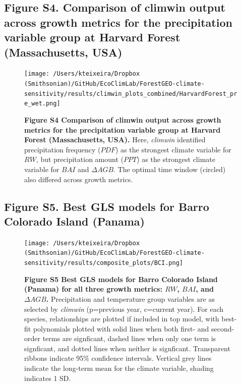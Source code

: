 \documentclass[
]{article}
\begin{document}
\newpage

\hypertarget{figure-s4.-comparison-of-climwin-output-across-growth-metrics-for-the-precipitation-variable-group-at-harvard-forest-massachusetts-usa}{%
\subsection{Figure S4. Comparison of climwin output across growth
metrics for the precipitation variable group at Harvard Forest
(Massachusetts,
USA)}\label{figure-s4.-comparison-of-climwin-output-across-growth-metrics-for-the-precipitation-variable-group-at-harvard-forest-massachusetts-usa}}

\begin{figure}
\centering
\texttt{[image: /Users/kteixeira/Dropbox (Smithsonian)/GitHub/EcoClimLab/ForestGEO-climate-sensitivity/results/climwin\_plots\_combined/HarvardForest\_pre\_wet.png]}
\caption{\textbf{Figure S4 \textbar{} Comparison of climwin output
across growth metrics for the precipitation variable group at Harvard
Forest (Massachusetts, USA).} Here, \emph{climwin} identified
precipitation frequency (\(PDF\)) as the strongest climate variable for
\(RW\), but precipitation amount (\(PPT\)) as the strongest climate
variable for \(BAI\) and \(\Delta AGB\). The optimal time window
(circled) also differed across growth metrics.}
\end{figure}

\newpage

\hypertarget{figure-s5.-best-gls-models-for-barro-colorado-island-panama}{%
\subsection{Figure S5. Best GLS models for Barro Colorado Island
(Panama)}\label{figure-s5.-best-gls-models-for-barro-colorado-island-panama}}

\begin{figure}
\centering
\texttt{[image: /Users/kteixeira/Dropbox (Smithsonian)/GitHub/EcoClimLab/ForestGEO-climate-sensitivity/results/composite\_plots/BCI.png]}
\caption{\textbf{Figure S5 \textbar{} Best GLS models for Barro Colorado
Island (Panama) for all three growth metrics: \(RW\), \(BAI\), and
\(\Delta AGB\).} Precipitation and temperature group variables are as
selected by \emph{climwin} (p=previous year, c=current year). For each
species, relationships are plotted if included in top model, with
best-fit polynomials plotted with solid lines when both first- and
second-order terms are signficant, dashed lines when only one term is
signficant, and dotted lines when neither is signficant. Transparent
ribbons indicate 95\% confidence intervals. Vertical grey lines indicate
the long-term mean for the climate variable, shading indicates 1 SD.}
\end{figure}
\end{document}
